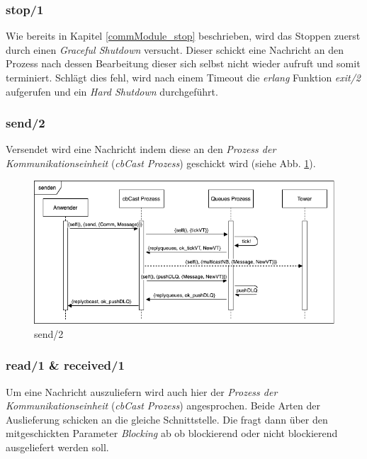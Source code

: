 \subsubsection{stop/1} \label{cbcast_stop_realisierung}

Wie bereits in Kapitel \ref{commModule_stop} beschrieben, wird das Stoppen zuerst durch einen \textit{Graceful Shutdown} versucht. Dieser schickt eine Nachricht an den Prozess nach dessen Bearbeitung dieser sich selbst nicht wieder aufruft und somit terminiert. Schlägt dies fehl, wird nach einem Timeout die \textit{erlang} Funktion \textit{exit/2} aufgerufen und ein \textit{Hard Shutdown} durchgeführt.

\subsubsection{send/2} \label{cbcast_send_realisierung}

Versendet wird eine Nachricht indem diese an den \textit{Prozess der Kommunikationseinheit} (\textit{cbCast Prozess}) geschickt wird (siehe Abb. \ref{fig:sequence_send_realisierung}).

\begin{figure}[htbp]
\begin{center}
\includegraphics[scale=0.6]{Latex/Bilder/send_realisierung.png}
\caption{\label{fig:sequence_send_realisierung} send/2}
\end{center}
\end{figure}

\subsubsection{read/1 \& received/1} \label{cbcast_read_received_realisierung}

Um eine Nachricht auszuliefern wird auch hier der \textit{Prozess der Kommunikationseinheit} (\textit{cbCast Prozess}) angesprochen. Beide Arten der Auslieferung schicken an die gleiche Schnittstelle. Die fragt dann über den mitgeschickten Parameter \textit{Blocking} ab ob blockierend oder nicht blockierend ausgeliefert werden soll.

